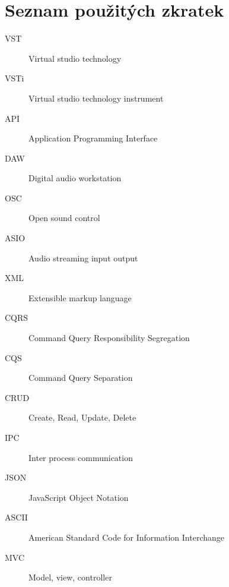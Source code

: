 \documentclass[thesis=M,czech]{FITthesis}[2019/03/06]
\begin{document}
\chapter{Seznam použitých zkratek}
\begin{description}
	\item[VST] Virtual studio technology
	\item[VSTi] Virtual studio technology instrument
	\item[API] Application Programming Interface
	\item[DAW] Digital audio workstation
	\item[OSC] Open sound control
	\item[ASIO] Audio streaming input output
	\item[XML] Extensible markup language
	\item[CQRS] Command Query Responsibility Segregation
	\item[CQS] Command Query Separation
	\item[CRUD] Create, Read, Update, Delete
	\item[IPC] Inter process communication
	\item[JSON] JavaScript Object Notation
	\item[ASCII] American Standard Code for Information Interchange
	\item[MVC] Model, view, controller
\end{description}
\end{document}
